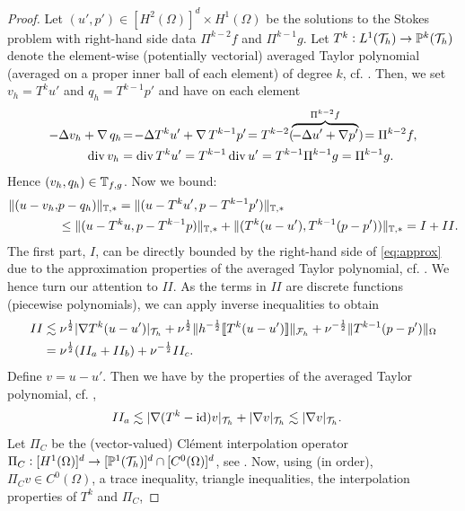 \documentclass[pdflatex,sn-mathphys,Numbered]{sn-jnl}%
\theoremstyle{remark}%
\theoremstyle{definition}%
\begin{document}
\begin{proof}
  Let $(u',p') \in [H^{2}(\Omega)]^d \times H^{1}(\Omega)$ be the
  solutions to the Stokes problem with right-hand side data
  $\Pi^{k-2}f$ and $\Pi^{k-1}g$. Let $T^k: L^1({\mathcal{T}_h}) \to \mathbb{P}^k({\mathcal{T}_h})$
  denote the element-wise (potentially vectorial) averaged Taylor
  polynomial (averaged on a proper inner ball of each element) of
  degree $k$, cf. \cite[Section 4.1-4.3]{brennerscott}. Then, we set $v_h = T^k u'$ and
  $q_h = T^{k-1} p'$ and have on each element
\begin{align*}
  -\Delta v_h + \operatorname{\nabla} q_h\! &=\! - \Delta T^k u' + \operatorname{\nabla} T^{k-1} p'\! 
  = T^{k-2}(\! \overbrace{- \Delta u' + \operatorname{\nabla} \!p'}^{\Pi^{k-2} f} )\! = \Pi^{k-2} f, \\
 \operatorname{\mathrm{div}} v_h &= \operatorname{\mathrm{div}} T^k u' = T^{k-1} \operatorname{\mathrm{div}} u' = T^{k-1} \Pi^{k-1} g = \Pi^{k-1} g.
\end{align*}
Hence $(v_h,q_h) \in \mathbb{T}_{f,g}$.
Now we bound:
\begin{align*}
  \Vert (u-v_h,&p-q_h) \Vert_{\mathbb{T},\ast} 
= \Vert (u-T^ku',p-T^{k-1}p') \Vert_{\mathbb{T},\ast} \\
 &\leq \Vert (u-T^ku,p-T^{k-1}p) \Vert_{\mathbb{T},\ast} + \Vert (T^k(u-u'),T^{k-1}(p-p')) \Vert_{\mathbb{T},\ast} = 
 I + II.
\end{align*}
The first part, $I$, can be directly bounded by the right-hand side of \eqref{eq:approx} due to the approximation properties of the averaged Taylor polynomial, cf. \cite[Lemma 4.3.8]{brennerscott}.
We hence turn our attention to $II$. As the terms in $II$ are discrete functions (piecewise polynomials), we can apply inverse inequalities to obtain
\begin{align*}
  II & \lesssim  \nu^{\frac12} \vert \nabla T^k (u-u') \vert_{{\mathcal{T}_h}} + \nu^{\frac12} \Vert h^{-\frac12} [\![T^k (u-u')]\!] \Vert_{{\mathcal{F}_h}} + \nu^{-\frac12} \Vert T^{k-1}(p - p') \Vert_{\Omega} \\ &= \nu^{\frac12} (II_a + II_b) + \nu^{-\frac12} II_c.
\end{align*}
Define $v
= u -u'$. Then we have by the properties of the averaged Taylor
polynomial, cf. \cite[Lemma 4.3.8]{brennerscott},
\begin{align*}
  II_a & \lesssim  \vert  \nabla (T^k - \operatorname{id}) v \vert_{{\mathcal{T}_h}} + \vert  \nabla v \vert_{{\mathcal{T}_h}} \lesssim \vert  \nabla v \vert_{{\mathcal{T}_h}}.
\end{align*}
Let $\Pi_C$ be the (vector-valued) Clément interpolation operator $\Pi_C:
[H^1(\Omega)]^d \to [\mathbb{P}^1({\mathcal{T}_h})]^d\cap [C^0(\Omega)]^d$, see \cite{clement}.
  Now, using (in order),
  $\Pi_C v \in C^0(\Omega)$, 
  a trace inequality, triangle inequalities,   
  the interpolation properties of $T^k$ and $\Pi_C$,

\end{proof}
\end{document}
